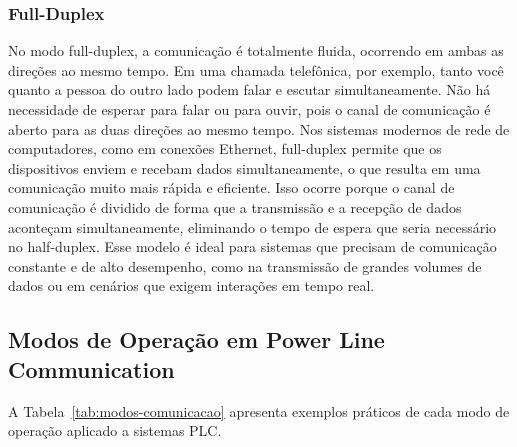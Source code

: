 \documentclass[12pt]{article}
\begin{document}
\subsubsection{Full-Duplex}
No modo full-duplex, a comunicação é totalmente fluida, ocorrendo em ambas as direções ao mesmo tempo. Em uma chamada telefônica, por exemplo, tanto você quanto a pessoa do outro lado podem falar e escutar simultaneamente. Não há necessidade de esperar para falar ou para ouvir, pois o canal de comunicação é aberto para as duas direções ao mesmo tempo. Nos sistemas modernos de rede de computadores, como em conexões Ethernet, full-duplex permite que os dispositivos enviem e recebam dados simultaneamente, o que resulta em uma comunicação muito mais rápida e eficiente. Isso ocorre porque o canal de comunicação é dividido de forma que a transmissão e a recepção de dados aconteçam simultaneamente, eliminando o tempo de espera que seria necessário no half-duplex. Esse modelo é ideal para sistemas que precisam de comunicação constante e de alto desempenho, como na transmissão de grandes volumes de dados ou em cenários que exigem interações em tempo real. \cite{galvao2024}

\subsection{Modos de Operação em Power Line Communication}
A Tabela~\ref{tab:modos-comunicacao} apresenta exemplos práticos de cada modo de operação aplicado a sistemas PLC.
\end{document}
